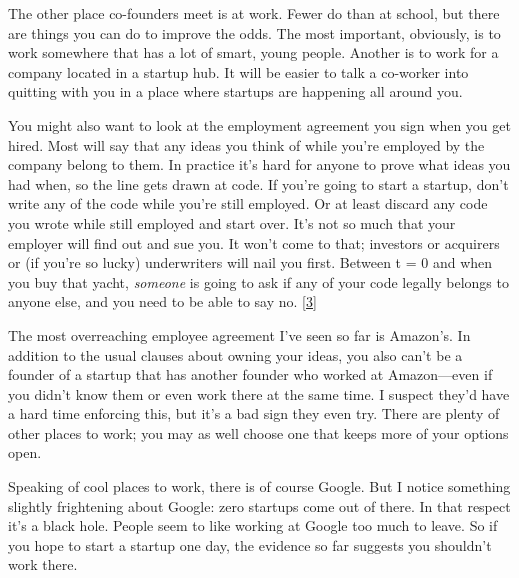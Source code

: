 The
                    other place co-founders meet is at work. Fewer do than at
                    school, but there are things you can do to improve the odds.
                    The most important, obviously, is to work somewhere that has
                    a lot of smart, young people. Another is to work for a
                    company located in a startup hub. It will be easier to talk
                    a co-worker into quitting with you in a place where startups
                    are happening all around you.

You might also want
                    to look at the employment agreement you sign when you get
                    hired. Most will say that any ideas you think of while
                    you're employed by the company belong to them. In practice
                    it's hard for anyone to prove what ideas you had when, so
                    the line gets drawn at code. If you're going to start a
                    startup, don't write any of the code while you're still
                    employed. Or at least discard any code you wrote while still
                    employed and start over. It's not so much that your employer
                    will find out and sue you. It won't come to that; investors
                    or acquirers or (if you're so lucky) underwriters will nail
                    you first. Between t = 0 and when you buy that yacht,
                    \emph{someone} is going to ask if any of your code legally
                    belongs to anyone else, and you need to be able to say no.
                    [\href{\#f3n}{3}]

The most overreaching employee agreement I've
                    seen so far is Amazon's. In addition to the usual clauses
                    about owning your ideas, you also can't be a founder of a
                    startup that has another founder who worked at
                    Amazon---even if you didn't know them or even work there
                    at the same time. I suspect they'd have a hard time
                    enforcing this, but it's a bad sign they even try. There are
                    plenty of other places to work; you may as well choose one
                    that keeps more of your options open.

Speaking of
                    cool places to work, there is of course Google. But I notice
                    something slightly frightening about Google: zero startups
                    come out of there. In that respect it's a black hole. People
                    seem to like working at Google too much to leave. So if you
                    hope to start a startup one day, the evidence so far
                    suggests you shouldn't work there.

